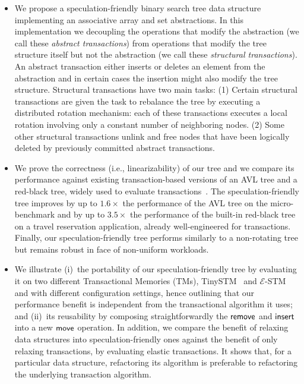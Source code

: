 \begin{itemize}
\item We propose a speculation-friendly binary search tree data structure
implementing an associative array and set abstractions.
In this implementation we decoupling the operations that modify the abstraction (we call these \emph{abstract transactions}) from operations
that modify the tree structure itself but not the abstraction (we call these \emph{structural transactions}).
An abstract transaction either inserts or deletes an element from the abstraction and 
in certain cases the insertion might also modify the tree structure.
Structural transactions have two main tasks:
(1) Certain structural transactions are given the task to rebalance the tree 
by executing a distributed rotation mechanism: each of these transactions executes a local rotation involving
only a constant number of neighboring nodes. 
(2) Some other structural transactions unlink and free nodes that have been logically deleted 
by previously committed abstract transactions.

\item We prove the correctness (i.e., linearizability) of our tree and we compare its performance against existing transaction-based versions of an AVL tree and a red-black tree,
widely used to evaluate transactions~\cite{DSS06,HLMS03,CCKO08,HK08,FFR08,YNW+08,DFGG11}.
The speculation-friendly tree improves by up to $1.6\times$ the performance of the AVL tree on the micro-benchmark and 
by up to $3.5\times$ the performance of the built-in red-black tree on a travel reservation application, already well-engineered for transactions.
Finally, our speculation-friendly tree performs similarly to a non-rotating tree but remains robust in face of non-uniform workloads.

\item We illustrate (i)~the portability of our speculation-friendly tree by evaluating it on two different Transactional Memories (TMs), TinySTM~\cite{FFR08} 
and $\mathcal{E}$-STM~\cite{FGG09} and with different configuration settings, hence outlining that our performance benefit is independent 
from the transactional algorithm it uses; and (ii)~its reusability by composing 
straightforwardly the $\lit{remove}$ and $\lit{insert}$ into a new $\lit{move}$ operation.
In addition, we compare the benefit of relaxing data structures into speculation-friendly ones against the benefit of only relaxing transactions,
by evaluating elastic transactions.
It shows that, for a particular data structure, refactoring its algorithm is preferable to refactoring the underlying transaction algorithm.
\end{itemize}

